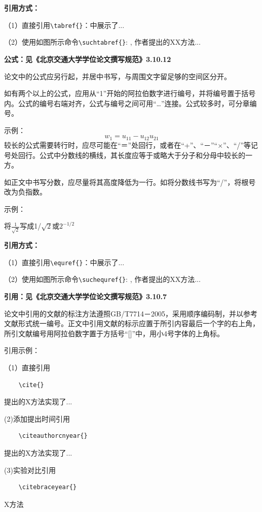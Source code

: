\textbf{引用方式：}

（1）直接引用\verb|\tabref{}|：中展示了...

（2）使用如图所示命令\verb|\suchtabref{}|: , 作者提出的XX方法...

\textbf{公式：见《北京交通大学学位论文撰写规范》3.10.12}

论文中的公式应另行起，并居中书写，与周围文字留足够的空间区分开。

如有两个以上的公式，应用从“1”开始的阿拉伯数字进行编号，并将编号置于括号内。公式的编号右端对齐，公式与编号之间可用“…”连接。公式较多时，可分章编号。

示例：
\begin{equation}
	\label{equ:label}
	{{w}_{1}}={{u}_{11}}-{{u}_{12}}{{u}_{21}}
\end{equation}
较长的公式需要转行时，应尽可能在“＝”处回行，或者在“+”、“－”“×”、“/”等记号处回行。公式中分数线的横线，其长度应等于或略大于分子和分母中较长的一方。

如正文中书写分数，应尽量将其高度降低为一行。如将分数线书写为“/”，将根号改为负指数。

示例：

将$\frac{1}{\sqrt{2}}$写成1/$\sqrt{2}$或${{2}^{-1/2}}$

\textbf{引用方式：}

（1）直接引用\verb|\equref{}|：中展示了...

（2）使用如图所示命令\verb|\suchequref{}|: , 作者提出的XX方法...

\textbf{引用：见《北京交通大学学位论文撰写规范》3.10.7}

论文中引用的文献的标注方法遵照GB/T7714－2005，采用顺序编码制，并以参考文献形式统一编号。正文中引用文献的标示应置于所引内容最后一个字的右上角，所引文献编号用阿拉伯数字置于方括号“[]”中，用小4号字体的上角标。

引用示例：

（1）直接引用
\begin{verbatim}
	\cite{}
\end{verbatim}
提出的X方法\cite{Adnan2021Accelerating}实现了...

(2)添加提出时间引用
\begin{verbatim}
	\citeauthorcnyear{}
\end{verbatim}
提出的X方法实现了...

(3)实验对比引用
\begin{verbatim}
	\citebraceyear{}
\end{verbatim}
X方法~


